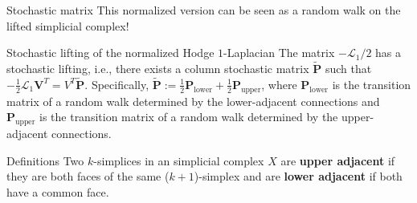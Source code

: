 \documentclass[aspectratio=169,xcolor=dvipsnames]{beamer}
\def\LL{\mathcal{L}}
\begin{document}
\begin{frame}{Stochastic matrix}
This normalized version can be seen as a random walk on the lifted simplicial complex!
    \begin{block}{Stochastic lifting of the normalized Hodge $1$-Laplacian}
The matrix $-\LL_1/2$ has a stochastic lifting, i.e., there exists a column stochastic matrix $\tilde{\boldsymbol{P}}$ such that $-\frac{1}{2}\LL_1\boldsymbol{V}^T = V^T\tilde{\boldsymbol{P}}$. Specifically, $\tilde{\boldsymbol{P}} := \frac{1}{2}\boldsymbol{P}_\text{lower} + \frac{1}{2}\boldsymbol{P}_\text{upper}$, where $\boldsymbol{P}_\text{lower}$ is the transition matrix of a random walk determined by the lower-adjacent connections and $\boldsymbol{P}_\text{upper}$ is the transition matrix of a random walk determined by the upper-adjacent connections. 
\end{block}
\begin{block}{Definitions}
    Two $k$-simplices in an simplicial complex $X$  are \textbf{upper adjacent} if they are both faces of the same
($k + 1$)-simplex and are \textbf{lower adjacent} if both have a common face. 
\end{block}
\end{frame}
\end{document}
